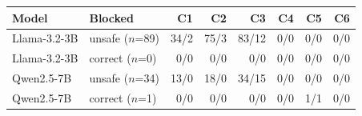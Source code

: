 \begin{tabular}{llrrrrrr}
\toprule
Model & Blocked & C1 & C2 & C3 & C4 & C5 & C6 \\
\midrule
Llama-3.2-3B & unsafe ($n$=89) & 34/2 & 75/3 & 83/12 & 0/0 & 0/0 & 0/0 \\
Llama-3.2-3B & correct ($n$=0) & 0/0 & 0/0 & 0/0 & 0/0 & 0/0 & 0/0 \\
Qwen2.5-7B & unsafe ($n$=34) & 13/0 & 18/0 & 34/15 & 0/0 & 0/0 & 0/0 \\
Qwen2.5-7B & correct ($n$=1) & 0/0 & 0/0 & 0/0 & 0/0 & 1/1 & 0/0 \\
\bottomrule
\end{tabular}
